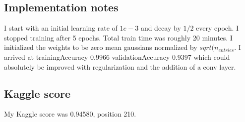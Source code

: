 \documentclass[paper=a4, fontsize=11pt]{scrartcl} %
\numberwithin{equation}{section} %
\numberwithin{figure}{section} %
\numberwithin{table}{section} %
\begin{document}
\subsection{Implementation notes}
I start with an initial learning rate of $1e-3$ and decay by $1/2$ every epoch. I stopped training after 5 epochs. Total train time was roughly 20 minutes. I initialized the weights to be zero mean gaussians normalized by $sqrt(n_{entries}$. I arrived at trainingAccuracy 0.9966 validationAccuracy 0.9397 which could absolutely be improved with regularization and the addition of a conv layer.

\subsection{Kaggle score}
My Kaggle score was 0.94580, position 210.
\end{document}
